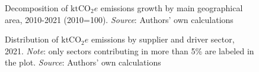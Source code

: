 \documentclass[
  10pt,
  twocolumn]{aft}
\begin{document}
\begin{figure}[!ht]


\caption{\label{fig-cf-growth-period}Decomposition of \(\text{ktCO}_2e\)
emissions growth by main geographical area, 2010-2021 (2010=100).
\emph{Source}: Authors' own calculations}

\end{figure}%
\begin{figure}


\caption{\label{fig-cf-supplier-driver}Distribution of
\(\text{ktCO}_2e\) emissions by supplier and driver sector, 2021.
\emph{Note}: only sectors contributing in more than 5\% are labeled in
the plot. \emph{Source}: Authors' own calculations}

\end{figure}%
\end{document}
